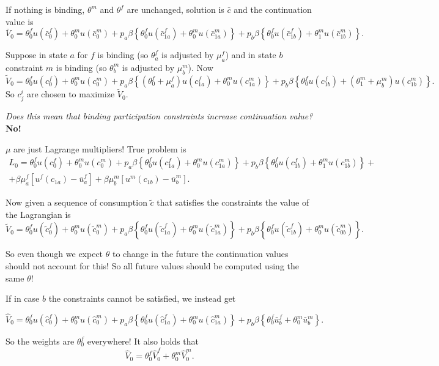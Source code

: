 \documentclass[12pt,letter]{article}
\begin{document}
If nothing is binding, $\theta^m$ and $\theta^f$ are unchanged, solution is $\bar{c}$ and the continuation value is
\[\bar V_0 = \theta^f_0u(\bar c^f_0) + \theta^m_0 u(\bar c^m_0) +  p_a \beta \left\{ \theta^f_{0} u(\bar c^f_{1a}) + \theta^m_{0} u(\bar c^m_{1a})\right\} +  p_b\beta \left\{ \theta^f_{0} u(\bar c^f_{1b}) + \theta^m_{1} u(\bar c^m_{1b})\right\}.\]

Suppose in state $a$ for $f$ is binding (so $\theta_a^f$ is adjusted by $\mu^f_a$) and in state $b$ constraint $m$ is binding (so $\theta_b^m$ is adjusted by $\mu^m_b$). Now
\[\tilde{V}_0 = \theta^f_0u(c^f_0) + \theta^m_0 u(c^m_0) +  p_a \beta \left\{ (\theta^f_{0} + \mu^f_a) u(c^f_{1a}) + \theta^m_{0} u(c^m_{1a})\right\} +  p_b\beta \left\{ \theta^f_{0} u(c^f_{1b}) + (\theta^m_{1}+\mu^m_b) u(c^m_{1b})\right\}.\]
So $c^i_j$ are chosen to maximize $\tilde{V}_0$.

\textit{Does this mean that binding participation constraints increase continuation value?} \textbf{No!}

$\mu$ are just Lagrange multipliers! True problem is 
\begin{align*}L_0 = \theta^f_0u(c^f_0) + \theta^m_0 u(c^m_0) +  p_a \beta \left\{ \theta^f_{0} u(c^f_{1a}) + \theta^m_{0} u(c^m_{1a})\right\} +  p_b\beta \left\{ \theta^f_{0} u(c^f_{1b}) + \theta^m_{1} u(c^m_{1b})\right\} + \\ +\beta \mu^f_a [u^f(c_{1a}) - \bar{u}^f_a] + \beta \mu^m_b [u^m(c_{1b}) - \bar{u}^m_b] .\end{align*} 

Now given a sequence of consumption $\tilde{c}$ that satisfies the constraints the value of the Lagrangian is
\[\tilde{V}_0 =  \theta^f_0u(\tilde c^f_0) + \theta^m_0 u(\tilde c^m_0) +  p_a \beta \left\{ \theta^f_{0} u(\tilde c^f_{1a}) + \theta^m_{0} u(\tilde c^m_{1a})\right\} +  p_b\beta \left\{ \theta^f_{0} u(\tilde c^f_{1b}) + \theta^m_{0} u(\tilde c^m_{0b})\right\}.\]

So even though we expect $\theta$ to change in the future the continuation values should not account for this! So all future values should be computed using the same $\theta$!

If in case $b$ the constraints cannot be satisfied, we instead get

\[\hat{V}_0 =  \theta^f_0u(\hat c^f_0) + \theta^m_0 u(\hat c^m_0) +  p_a \beta \left\{ \theta^f_{0} u(\hat c^f_{1a}) + \theta^m_{0} u(\hat c^m_{1a})\right\} +  p_b\beta \left\{ \theta^f_{0} \bar{u}^f_b + \theta^m_{0} \bar{u}^m_b \right\}.\]

So the weights are $\theta^f_0$ everywhere! It also holds that
\[\hat{V}_0 =  \theta^f_0\hat{V}^f_0 + \theta^m_0\hat{V}^m_0.\]
\end{document}

